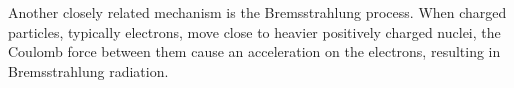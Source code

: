 \begin{itemize}
    Another closely related mechanism is the Bremsstrahlung process.
    When charged particles, typically electrons, move close to
    heavier positively charged nuclei, the Coulomb force between
    them cause an acceleration on the electrons, resulting in
    Bremsstrahlung radiation.
    



\end{itemize}




